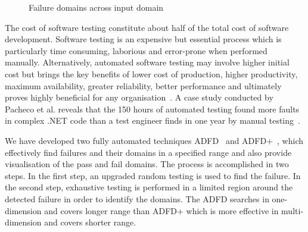 \documentclass[runningheads,a4paper]{llncs}
\begin{document}
\smallskip
\begin{figure} [H]
\centering
{}
\smallskip
\caption{Failure domains across input domain~\cite{chan1996proportional}}
\label{fig:patterns}
\end{figure} 


The cost of software testing constitute about half of the total cost of software development. Software testing is an expensive but essential process which is particularly time consuming, laborious and error-prone when performed manually. Alternatively, automated software testing may involve higher initial cost but brings the key benefits of lower cost of production, higher productivity, maximum availability, greater reliability, better performance and ultimately proves highly beneficial for any organisation~\cite{Beizer1990}. A case study conducted by Pacheco et al. reveals that the 150 hours of automated testing found more faults in complex .NET code than a test engineer finds in one year by manual testing~\cite{pacheco2008finding}.

We have developed two fully automated techniques ADFD~\cite{ahmad2013adfd} and ADFD+~\cite{ahmad2014adfd2}, which effectively find failures and their domains in a specified range and also provide visualisation of the pass and fail domains. The process is accomplished in two steps. In the first step, an upgraded random testing is used to find the failure. In the second step, exhaustive testing is performed in a limited region around the detected failure in order to identify the domains. The ADFD searches in one-dimension and covers longer range than ADFD+ which is more effective in multi-dimension and covers shorter range.
\end{document}
